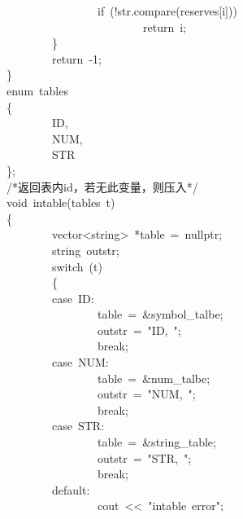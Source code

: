 \documentclass{article}
\begin{document}
\begin{mdpre}
~~~~~~~~~~~~~~~~{if}~(!str.compare(reserves{}[i]))\\
~~~~~~~~~~~~~~~~~~~~~~~~{return}~i;\\
~~~~~~~~\}\\
~~~~~~~~{return}~-{1};\\
\}\\
{enum}~tables\\
\{\\
~~~~~~~~{ID},\\
~~~~~~~~{NUM},\\
~~~~~~~~{STR}\\
\};\\
{/*}{返回表内id，若无此变量，则压入}{*/}\\
{void}~intable(tables~t)\\
\{\\
~~~~~~~~vector\textless{}string\textgreater{}~*table~=~{nullptr};\\
~~~~~~~~string~outstr;\\
~~~~~~~~{switch}~(t)\\
~~~~~~~~\{\\
~~~~~~~~{case}~{ID}:\\
~~~~~~~~~~~~~~~~table~=~\&symbol\_talbe;\\
~~~~~~~~~~~~~~~~outstr~=~{"}{ID,~}{"};\\
~~~~~~~~~~~~~~~~{break};\\
~~~~~~~~{case}~{NUM}:\\
~~~~~~~~~~~~~~~~table~=~\&num\_talbe;\\
~~~~~~~~~~~~~~~~outstr~=~{"}{NUM,~}{"};\\
~~~~~~~~~~~~~~~~{break};\\
~~~~~~~~{case}~{STR}:\\
~~~~~~~~~~~~~~~~table~=~\&string\_table;\\
~~~~~~~~~~~~~~~~outstr~=~{"}{STR,~}{"};\\
~~~~~~~~~~~~~~~~{break};\\
~~~~~~~~{default}:\\
~~~~~~~~~~~~~~~~cout~\textless{}\textless{}~{"}{intable~error}{"};\\

\end{mdpre}
\end{document}
